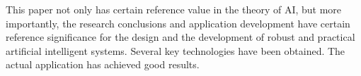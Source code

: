 \begin{enabstract}
  This paper not only has certain reference value in the theory of AI, but more importantly, the research conclusions and application development have certain reference significance for the design and the development of robust and practical artificial intelligent systems. Several key technologies have been obtained. The actual application has achieved good results.

\end{enabstract}
